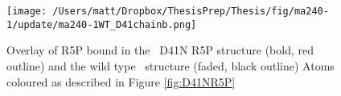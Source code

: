 \begin{figure}[!hbtp]
\centering

  \centering
  \texttt{[image: /Users/matt/Dropbox/ThesisPrep/Thesis/fig/ma240-1/update/ma240-1WT\_D41chainb.png]}
\caption[Comparison of R5P binding to wild type \atpdx and D41N]{Overlay of R5P bound in the \atpdx ~D41N R5P structure (bold, red outline) and the wild type \atpdx ~structure (faded, black outline) Atoms coloured as described in Figure \ref{fig:D41NR5P}\label{fig:R5P_binding}}
\end{figure} 


     
\newpage
